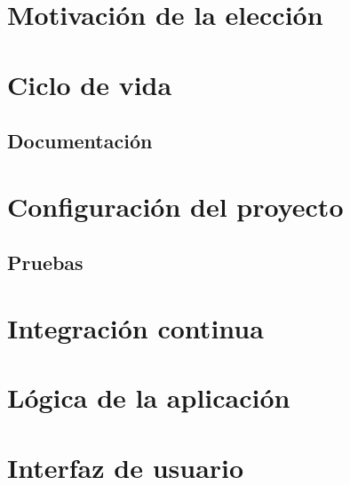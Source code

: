 



\section{Motivación de la elección}
\section{Ciclo de vida}
\subsection{Documentación}
\section{Configuración del proyecto}
\subsection{Pruebas}
\section{Integración continua}
\section{Lógica de la aplicación}
\section{Interfaz de usuario}